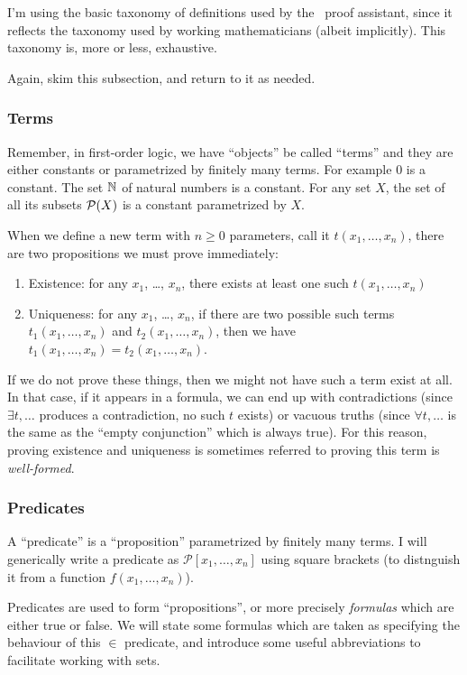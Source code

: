 I'm using the basic taxonomy of definitions used by the \Mizar\ proof
assistant, since it reflects the taxonomy used by working mathematicians
(albeit implicitly). This taxonomy is, more or less, exhaustive.

Again, skim this subsection, and return to it as needed.

\subsubsection{Terms} Remember, in first-order logic, we have ``objects''
be called ``terms'' and they are either constants or parametrized by
finitely many terms. For example $0$ is a constant. The set $\mathbb{N}$ of
natural numbers is a constant. For any set $X$, the set of all its
subsets $\mathcal{P}(X)$ is a constant parametrized by $X$.

When we define a new term with $n\geq0$ parameters, call it $t(x_{1},\dots,x_{n})$, there are two propositions we must prove
immediately:
\begin{enumerate}
\item Existence: for any $x_{1}$, \dots, $x_{n}$, there exists at least one such $t(x_{1},\dots,x_{n})$
\item Uniqueness: for any $x_{1}$, \dots, $x_{n}$, if there are two possible such terms $t_{1}(x_{1},\dots,x_{n})$ and
  $t_{2}(x_{1},\dots,x_{n})$, then we have $t_{1}(x_{1},\dots,x_{n})=t_{2}(x_{1},\dots,x_{n})$.
\end{enumerate}
If we do not prove these things, then we might not have such a term
exist at all. In that case, if it appears in a formula, we can end up
with contradictions (since $\exists t,\dots$ produces a contradiction,
no such $t$ exists) or vacuous truths (since $\forall t,\dots$ is the
same as the ``empty conjunction'' which is always true). For this
reason, proving existence and uniqueness is sometimes referred to
proving this term is \emph{well-formed}.

\subsubsection{Predicates} A ``predicate'' is a ``proposition''
parametrized by finitely many terms. I will generically write a
predicate as $\mathcal{P}[x_{1},\dots,x_{n}]$ using square brackets (to
distnguish it from a function $f(x_{1},\dots,x_{n})$).

Predicates are used to form ``propositions'', or more precisely
\emph{formulas} which are either true or false. We will state some
formulas which are taken as specifying the behaviour of this $\in$
predicate, and introduce some useful abbreviations to facilitate working
with sets. 

